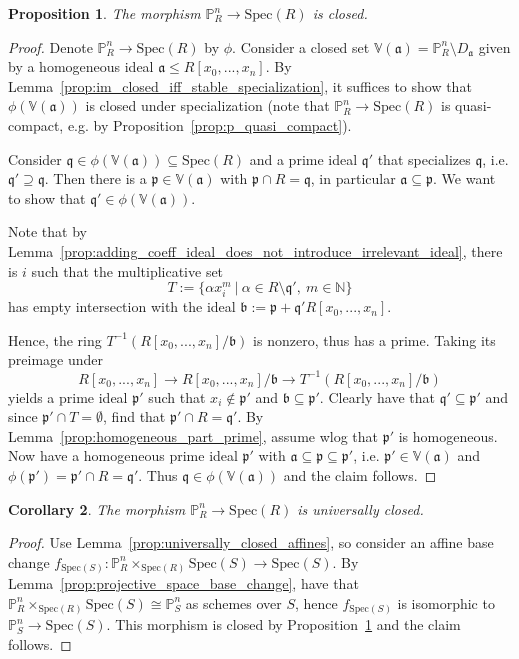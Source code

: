 \documentclass{scrartcl}
\newcommand{\N}{\mathbb{N}}
\newcommand{\V}{\mathbb{V}}
\renewcommand{\P}{\mathbb{P}}
\newcommand{\p}{\mathfrak{p}}
\newcommand{\q}{\mathfrak{q}}
\renewcommand{\a}{\mathfrak{a}}
\renewcommand{\b}{\mathfrak{b}}
\newcommand{\Spec}{\mathrm{Spec}}
\newtheorem{prop}{Proposition}
\newtheorem{corollary}[prop]{Corollary}
\theoremstyle{definition}
\begin{document}
\begin{prop}
    \label{prop:projective_structure_morphism_closed}
    The morphism $\P_R^n \to \Spec(R)$ is closed.
\end{prop}
\begin{proof}
    Denote $\P_R^n \to \Spec(R)$ by $\phi$.
    Consider a closed set $\V(\a) = \P_R^n \setminus D_\a$ given by a homogeneous ideal $\a \leq R[x_0, ..., x_n]$.
    By Lemma~\ref{prop:im_closed_iff_stable_specialization}, it suffices to show that $\phi(\V(\a))$ is closed under specialization (note that $\P_R^n \to \Spec(R)$ is quasi-compact, e.g. by Proposition~\ref{prop:p_quasi_compact}).

    Consider $\q \in \phi(\V(\a)) \subseteq \Spec(R)$ and a prime ideal $\q'$ that specializes $\q$, i.e. $\q' \supseteq \q$.
    Then there is a $\p \in \V(\a)$ with $\p \cap R = \q$, in particular $\a \subseteq \p$.
    We want to show that $\q' \in \phi(\V(\a))$.

    Note that by Lemma~\ref{prop:adding_coeff_ideal_does_not_introduce_irrelevant_ideal}, there is $i$ such that the multiplicative set
    \begin{equation*}
        T := \{ \alpha x_i^m \ | \ \alpha \in R \setminus \q', \ m \in \N \}
    \end{equation*}
    has empty intersection with the ideal $\b := \p + \q' R[x_0, ..., x_n]$.
    
    Hence, the ring $T^{-1}(R[x_0, ..., x_n]/\b)$ is nonzero, thus has a prime.
    Taking its preimage under
    \begin{equation*}
        R[x_0, ..., x_n] \to R[x_0, ..., x_n]/\b \to T^{-1}(R[x_0, ..., x_n]/\b)
    \end{equation*}
    yields a prime ideal $\p'$ such that $x_i \notin \p'$ and $\b \subseteq \p'$.
    Clearly have that $\q' \subseteq \p'$ and since $\p' \cap T = \emptyset$, find that $\p' \cap R = \q'$.
    By Lemma~\ref{prop:homogeneous_part_prime}, assume wlog that $\p'$ is homogeneous.
    Now have a homogeneous prime ideal $\p'$ with $\a \subseteq \p \subseteq \p'$, i.e. $\p' \in \V(\a)$ and $\phi(\p') = \p' \cap R = \q'$.
    Thus $\q \in \phi(\V(\a))$ and the claim follows.
\end{proof}
\begin{corollary}
    The morphism $\P_R^n \to \Spec(R)$ is universally closed.
\end{corollary}
\begin{proof}
    Use Lemma~\ref{prop:universally_closed_affines}, so consider an affine base change $f_{\Spec(S)}: \P_R^n \times_{\Spec(R)} \Spec(S) \to \Spec(S)$.
    By Lemma~\ref{prop:projective_space_base_change}, have that $\P_R^n \times_{\Spec(R)} \Spec(S) \cong \P_S^n$ as schemes over $S$, hence $f_{\Spec(S)}$ is isomorphic to $\P_S^n \to \Spec(S)$.
    This morphism is closed by Proposition~\ref{prop:projective_structure_morphism_closed} and the claim follows.
\end{proof}
\end{document}
